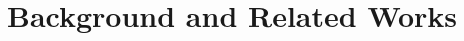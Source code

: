 \chapter{Background and Related Works}

\Blindtext
\blinditemize
\blindenumerate
\blinddescription
\blindmathtrue
\blindmathfalse
\blindmathpaper